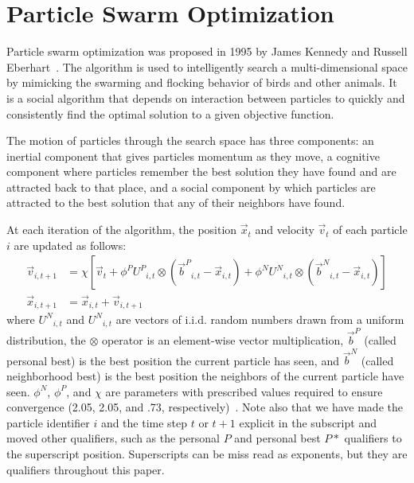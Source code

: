 \documentclass[journal,letterpaper]{IEEEtran}
\providecommand{\pers}{\ensuremath{P}}
\providecommand{\neigh}{\ensuremath{N}}
\providecommand{\nURand}{\ensuremath{U^\neigh}}
\providecommand{\pURand}{\ensuremath{U^\pers}}
\providecommand{\ppos}{\ensuremath{\Vec{x}}}
\providecommand{\pvel}{\ensuremath{\Vec{v}}}
\providecommand{\nbest}{\ensuremath{\Vec{b}^\neigh}}
\providecommand{\pbest}{\ensuremath{\Vec{b}^\pers}}
\providecommand{\constriction}{\ensuremath{\chi}}
\providecommand{\ncoeff}{\ensuremath{\phi^\neigh}}
\providecommand{\pcoeff}{\ensuremath{\phi^\pers}}
\begin{document}
\section{Particle Swarm Optimization}
\label{sec:pso}

Particle swarm optimization was proposed in 1995 by James Kennedy and Russell
Eberhart~\cite{kennedy-icnn95}.  The algorithm is used to intelligently search
a multi-dimensional space by mimicking the swarming and flocking behavior of
birds and other animals. It is a social algorithm that depends on interaction
between particles to quickly and consistently find the optimal solution to a
given objective function.

The motion of particles through the search space has three components: an
inertial component that gives particles momentum as they move, a cognitive
component where particles remember the best solution they have found and are
attracted back to that place, and a social component by which particles are
attracted to the best solution that any of their neighbors have found.

At each iteration of the algorithm, the position $\ppos_t$ and velocity
$\pvel_t$ of each particle $i$ are updated as follows:
\begin{align}
\label{eq:velupdate}
	\pvel_{i,t+1} &=
		\constriction \left[ \pvel_t +
			\pcoeff\pURand_{i,t}\otimes(\pbest_{i,t} - \ppos_{i,t}) +
			\ncoeff\nURand_{i,t}\otimes(\nbest_{i,t} - \ppos_{i,t})
		\right] \\
\label{eq:posupdate}
	\ppos_{i,t+1} &= \ppos_{i,t} + \pvel_{i,t+1}
\end{align}
where \( \nURand_{i,t} \) and \( \nURand_{i,t} \) are vectors of i.i.d. random numbers drawn from a uniform
distribution, the \( \otimes \) operator is an element-wise vector
multiplication, $\pbest$ (called personal best) is the best position the
current particle has seen, and $\nbest$ (called neighborhood best) is the best
position the neighbors of the current particle have seen.  \( \ncoeff \), \(
\pcoeff \), and \( \constriction \) are parameters with prescribed values
required to ensure convergence (2.05, 2.05, and .73,
respectively)~\cite{clerc-tec02}. Note also that we have made the particle identifier $i$
and the time step $t$ or $t+1$ explicit in the subscript and moved other qualifiers,
such as the personal $P$ and personal best $P*$ qualifiers to the superscript position.
Superscripts can be miss read as exponents, but they are qualifiers throughout this paper.
\end{document}
